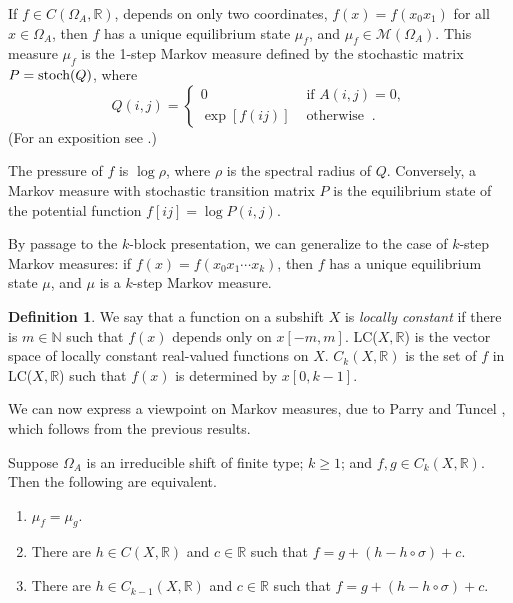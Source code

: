 \documentclass{kepart2010}
\theoremstyle{plain}
\theoremstyle{definition}
\newtheorem{defn}[thm]{Definition}
\theoremstyle{remark}
\theoremstyle{definition}
\numberwithin{equation}{section}
\begin{document}
If $f\in C(\Omega_A, \mathbb R)$, depends on only two coordinates,
$f(x) = f(x_0x_1)$ for all $x \in \Omega_A$, then $f$ has a unique
equilibrium state $\mu_f$, and $\mu_f \in \mathcal M( \Omega_A)$.
This measure $\mu_f$ is the 1-step Markov measure defined by the
stochastic matrix $P= \textnormal{stoch}(Q)$, where
\begin{equation} Q(i,j)=
\begin{cases}
0\qquad&\text{ if } A(i,j)=0, \\
\exp[f(ij)] &\text{ otherwise } \ .
\end{cases}
\end{equation} (For an exposition see \cite{ParryTuncel1982}.)

 The pressure of $f$ is $\log \rho$,
where $\rho $ is the spectral radius of $Q$.
Conversely, a Markov measure with stochastic transition
matrix $P$ is the equilibrium state of the potential function
$f[ij]=\log P(i,j)$.

By passage to the
$k$-block presentation, we can generalize to the
case of $k$-step Markov measures: if $f(x) = f(x_0x_1\cdots
x_k)$, then $f$ has a unique equilibrium state $\mu$, and
$\mu$ is a $k$-step Markov measure.

\begin{defn}
We say that a  function on a subshift $X$  is {\em locally
constant} if there is $m \in {\mathbb N}$ such that $f(x)$ depends only on
$x[-m,m]$. LC($X,\mathbb R$) is the vector space of
locally constant real-valued
functions on $X$. $C_k(X,\mathbb R)$ is the set of $f$
in LC($X,\mathbb R$) such that $f(x)$ is determined by
$x[0,k-1]$.
\end{defn}

We can now express a viewpoint on Markov measures, due to Parry and
Tuncel \cite{Tuncel1981,ParryTuncel1982-2}, which follows from the
previous results.

\begin{thm}\cite{ParryTuncel1982-2}
Suppose
 $\Omega_A$ is  an irreducible shift of finite type;
 $k \geq 1$;  and $f,g \in C_k(X,\mathbb R)$.
Then the following are equivalent.
\begin{enumerate}
\item $\mu_f = \mu_g$.
\item There are $h\in C(X, \mathbb R)$ and $c \in {\mathbb R}$ such that $f=g +
(h-h\circ \sigma) + c$.
\item There are $h\in C_{k-1}(X, \mathbb R )$ and $c \in {\mathbb R}$ such that $f=g +
(h-h\circ \sigma) +c$.
\end{enumerate}
\end{thm}
\end{document}
